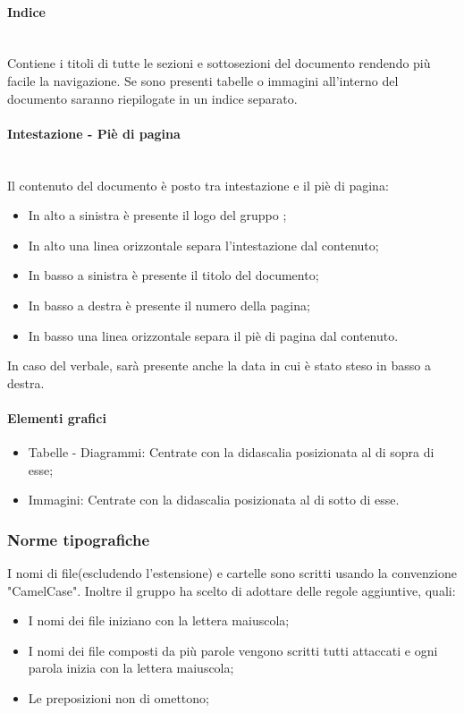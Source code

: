 \paragraph{Indice}\mbox{} \\
Contiene i titoli di tutte le sezioni e sottosezioni del documento rendendo più facile la navigazione.
Se sono presenti tabelle o immagini all'interno del documento saranno riepilogate in un indice separato.

\paragraph{Intestazione - Piè di pagina} \mbox{} \\
Il contenuto del documento è posto tra intestazione e il piè di pagina:

\begin{itemize}
\item In alto a sinistra è presente il logo del gruppo \Gruppo;
\item In alto una linea orizzontale separa l’intestazione dal contenuto;
\item In basso a sinistra è presente il titolo del documento;
\item In basso a destra è presente il numero della pagina;
\item In basso una linea orizzontale separa il piè di pagina dal contenuto.
\end{itemize}
In caso del verbale, sarà presente anche la data in cui è stato steso in basso a destra.

\paragraph{Elementi grafici}\mbox{}
\begin{itemize}
\item Tabelle - Diagrammi: Centrate con la didascalia posizionata al di sopra di esse;
\item Immagini: Centrate con la didascalia posizionata al di sotto di esse.
\end{itemize}

\subsubsection{Norme tipografiche}
I nomi di file(escludendo l'estensione) e cartelle sono scritti usando la convenzione "CamelCase". Inoltre il gruppo \Gruppo ha scelto di adottare delle regole aggiuntive, quali:
\begin{itemize}
\item I nomi dei file iniziano con la lettera maiuscola;
\item I nomi dei file composti da più parole vengono scritti tutti attaccati e ogni parola inizia con la lettera maiuscola;
\item Le preposizioni non di omettono;
\end{itemize}

